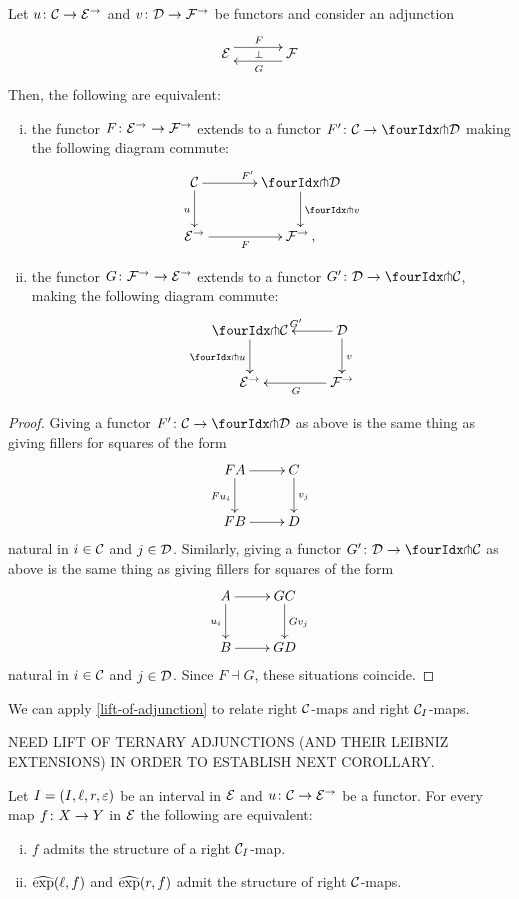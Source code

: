 \documentclass[reqno,10pt,a4paper,oneside]{amsart}
\begin{document}
\begin{proposition} \label{lift-of-adjunction} 
Let $u \co \cal{C} \to \cal{E}^{\to}$ and $v \co \cal{D} \to \cal{F}^{\to}$ be functors and consider an adjunction
\[
\xymatrix@C+1em{
  \cal{E}
  \ar@<5pt>[r]^{F}
  \ar@{}[r]|{\bot}
&
  \cal{F}
  \ar@<5pt>[l]^{G}
}
\]
Then, the following are equivalent:
\begin{enumerate}[(i)] 
\item the  functor $F \co \cal{E}^\to \to \cal{F}^\to$ extends to a functor $F' \co \cal{C} \to \liftl{\cal{D}}$ making the following diagram commute:
\[
\xymatrix@C=1.2cm{
  \cal{C}
  \ar[r]^{F'}
  \ar[d]_{u}
&
  \liftl{\cal{D}}
  \ar[d]^{\liftl{v}}
\\
  \cal{E}^{\to}
  \ar[r]_-{F}
&
  \cal{F}^{\to}\, ,}
\]
\item the functor $G \co \cal{F}^\to \to \cal{E}^\to$ extends to a functor $G' \co \cal{D} \to \liftr{\cal{C}}$, making the following diagram commute:
\[
\xymatrix{
  \liftr{\cal{C}}
  \ar[d]_{\liftr{u}}
&
  \cal{D}
  \ar[l]_{G'} 
  \ar[d]^{v}
\\
  \cal{E}^{\to}
&
  \cal{F}^{\to}
  \ar[l]^{G}
}
\]
\end{enumerate}
\end{proposition}

\begin{proof} Giving a functor $F' \co \cal{C} \to \liftl{\cal{D}}$ as above is the same thing as giving fillers for squares of the form
\[
\xymatrix{
FA \ar[d]_{F u_i} \ar[r] & C \ar[d]^{v_j} \\
FB \ar[r] & D }
\]
natural in $i  \in \cal{C}$ and $j \in \cal{D}$. Similarly, giving a functor $G' \co \cal{D} \to \liftl{\cal{C}}$ as above is the same thing as giving fillers for squares 
of the form
\[
\xymatrix{
A \ar[d]_{u_i} \ar[r] & GC \ar[d]^{Gv_j} \\
B \ar[r] & GD }
\]
 natural in $i \in \cal{C}$ and $j \in \cal{D}$. Since $F \dashv G$, these situations coincide.
\end{proof}

We can apply \cref{lift-of-adjunction} to relate right $\cal{C}$-maps and 
right  $\cal{C}_\interval$-maps.

NEED LIFT OF TERNARY ADJUNCTIONS (AND THEIR LEIBNIZ EXTENSIONS) IN ORDER TO ESTABLISH NEXT COROLLARY.



\begin{corollary} \label{prod-exp-general}
Let $\interval = (\interval, \intervall, \intervalr, \varepsilon)$ be an interval in $\catE$ and
 $u \co \cal{C} \to \catE^\to$ be a functor. For every map $f \co X \to Y$ in $\cal{E}$ 
 the following are equivalent: 
\begin{enumerate}[(i)]
\item $f$ admits the structure of a right $\cal{C}_\interval$-map. 
\item $\hatexp(\intervall, f)$ and $\hatexp(\intervalr, f)$ admit the structure of right $\cal{C}$-maps.
\end{enumerate} 
\end{corollary}
\end{document}
